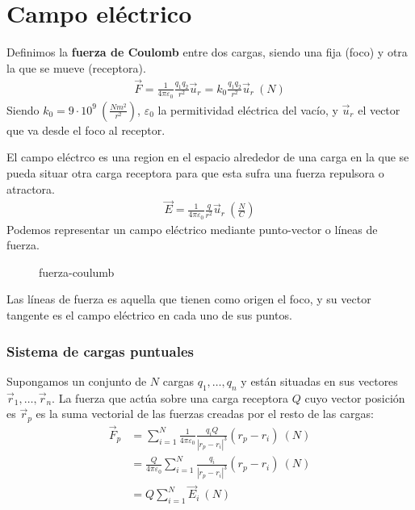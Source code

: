 \documentclass{../FisicaII.tex}
\begin{document}
\chapter{Campo eléctrico}
\begin{defin}
	Definimos la \textbf{fuerza de Coulomb} entre dos cargas, siendo una fija
	(foco) y otra la que se mueve (receptora).
	\begin{equation}
		\begin{split}
			\vec{F} = \frac{1}{4\pi \varepsilon_{0}} \frac{q_1q_2}{r^{2}}\vec{u}_{r}
			= k_{0} \frac{q_1q_2}{r^{2}}\vec{u}_{r}~(N)
		\end{split}
	\end{equation}
	Siendo $k_{0} = 9 \cdot 10^{9}~( \frac{Nm^{2}}{r^{2}})$, $\varepsilon_{0}$
	la permitividad eléctrica del vacío, y $\vec{u}_{r}$ el vector que va desde
	el foco al receptor.
\end{defin}
\begin{defin}
	El campo eléctrco es una region en el espacio alrededor de una carga en la que
	se pueda situar otra carga receptora para que esta sufra una fuerza
	repulsora o atractora.
	\begin{equation}
		\begin{split}
			\vec{E} = \frac{1}{4\pi \varepsilon_{0}} \frac{q}{r^{2}}\vec{u}_{r}
			~\left(\frac{N}{C}\right)
		\end{split}
	\end{equation}
	Podemos representar un campo eléctrico mediante punto-vector o líneas de
	fuerza.
\end{defin}
\begin{figure}[ht]
    \centering
    \caption{fuerza-coulumb}
    \label{fig:fuerza-coulumb}
\end{figure}
\begin{defin}
	Las líneas de fuerza es aquella que tienen como origen el foco, y su vector
	tangente es el campo eléctrico en cada uno de sus puntos.
\end{defin}
\subsection{Sistema de cargas puntuales}
Supongamos un conjunto de $N$  cargas $q_{1},\dots ,q_{n}$ y están situadas en
sus vectores $\vec{r}_{1},\dots ,\vec{r}_{n}$. La fuerza que actúa sobre una
carga receptora $Q$ cuyo vector posición es $\vec{r}_{p}$ es la suma vectorial
de las fuerzas creadas por el resto de las cargas:
\begin{equation}
	\begin{split}
		\vec{F}_{p} &= \sum_{i=1}^{N} \frac{1}{4\pi\varepsilon_{0}}
		\frac{q_{i}Q}{|r_{p}-r_{i}|^{3}}(r_{p}-r_{i}) ~(N)\\
					&= \frac{Q}{4\pi\varepsilon_{0}}\sum_{i=1}^{N}
					\frac{q_{i}}{|r_{p}-r_{i}|^{3}}(r_{p}-r_{i})~(N)\\
					&= Q \sum_{i=1}^{N} \vec{E}_{i}~(N)
	\end{split}
\end{equation}
\end{document}
